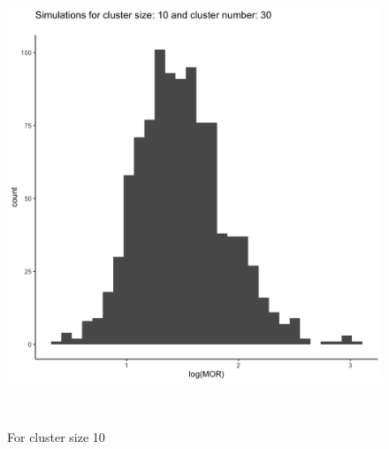 \documentclass[
  letterpaper,
  DIV=11,
  numbers=noendperiod,
  titlepage]{scrartcl}
\begin{document}
\begin{figure}
\begin{minipage}[t]{0.50\linewidth}
{{\includegraphics{../plots/ran-int/hist_30_10.png}

}

\caption{For cluster size 10}

}

\end{minipage}%
\newline
\begin{minipage}[t]{\linewidth}

{\centering 

~

}

\end{minipage}%
\newline
\begin{minipage}[t]{0.50\linewidth}

{\centering 

\raisebox{-\height}{

}}
\end{minipage}
\end{figure}
\end{document}
